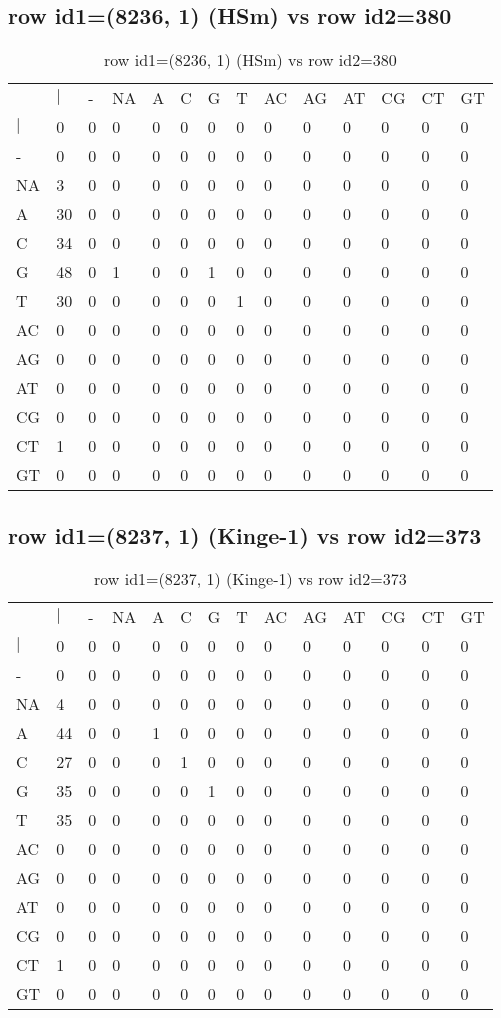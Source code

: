 \subsection{row id1=(8236, 1) (HSm) vs row id2=380}
\begin{center}
\begin{longtable}{|l|l|l|l|l|l|l|l|l|l|l|l|l|l|}
\caption{row id1=(8236, 1) (HSm) vs row id2=380} \label{table_dm358}\\
\hline
\\
\hline
&$|$&-&NA&A&C&G&T&AC&AG&AT&CG&CT&GT\\
$|$&0&0&0&0&0&0&0&0&0&0&0&0&0\\
-&0&0&0&0&0&0&0&0&0&0&0&0&0\\
NA&3&0&0&0&0&0&0&0&0&0&0&0&0\\
A&30&0&0&0&0&0&0&0&0&0&0&0&0\\
C&34&0&0&0&0&0&0&0&0&0&0&0&0\\
G&48&0&1&0&0&1&0&0&0&0&0&0&0\\
T&30&0&0&0&0&0&1&0&0&0&0&0&0\\
AC&0&0&0&0&0&0&0&0&0&0&0&0&0\\
AG&0&0&0&0&0&0&0&0&0&0&0&0&0\\
AT&0&0&0&0&0&0&0&0&0&0&0&0&0\\
CG&0&0&0&0&0&0&0&0&0&0&0&0&0\\
CT&1&0&0&0&0&0&0&0&0&0&0&0&0\\
GT&0&0&0&0&0&0&0&0&0&0&0&0&0\\
\hline
\end{longtable}
\end{center}

\subsection{row id1=(8237, 1) (Kinge-1) vs row id2=373}
\begin{center}
\begin{longtable}{|l|l|l|l|l|l|l|l|l|l|l|l|l|l|}
\caption{row id1=(8237, 1) (Kinge-1) vs row id2=373} \label{table_dm360}\\
\hline
\\
\hline
&$|$&-&NA&A&C&G&T&AC&AG&AT&CG&CT&GT\\
$|$&0&0&0&0&0&0&0&0&0&0&0&0&0\\
-&0&0&0&0&0&0&0&0&0&0&0&0&0\\
NA&4&0&0&0&0&0&0&0&0&0&0&0&0\\
A&44&0&0&1&0&0&0&0&0&0&0&0&0\\
C&27&0&0&0&1&0&0&0&0&0&0&0&0\\
G&35&0&0&0&0&1&0&0&0&0&0&0&0\\
T&35&0&0&0&0&0&0&0&0&0&0&0&0\\
AC&0&0&0&0&0&0&0&0&0&0&0&0&0\\
AG&0&0&0&0&0&0&0&0&0&0&0&0&0\\
AT&0&0&0&0&0&0&0&0&0&0&0&0&0\\
CG&0&0&0&0&0&0&0&0&0&0&0&0&0\\
CT&1&0&0&0&0&0&0&0&0&0&0&0&0\\
GT&0&0&0&0&0&0&0&0&0&0&0&0&0\\
\hline
\end{longtable}
\end{center}

